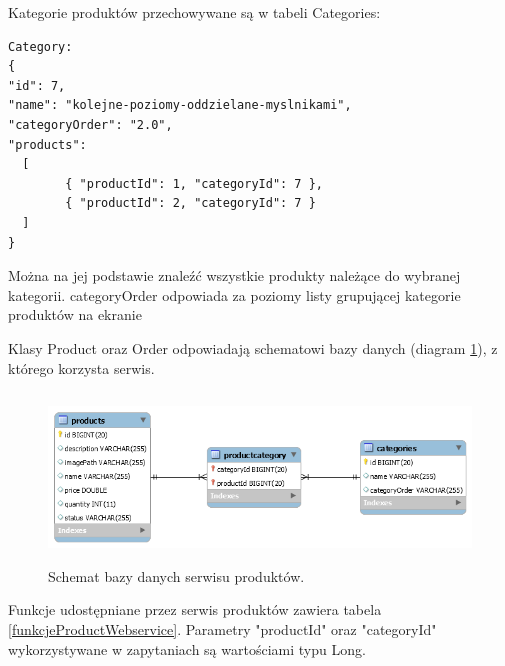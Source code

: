 \documentclass[11pt,a4paper,twoside]{article}
\begin{document}
Kategorie produktów przechowywane są w tabeli Categories:

\begin{lstlisting}
Category: 
{
"id": 7,
"name": "kolejne-poziomy-oddzielane-myslnikami",
"categoryOrder": "2.0",
"products": 
  [
		{ "productId": 1, "categoryId": 7 },
        { "productId": 2, "categoryId": 7 }
  ]
}
\end{lstlisting}
\vspace{-20pt}

Można na jej podstawie znaleźć wszystkie produkty należące do wybranej kategorii. categoryOrder odpowiada za poziomy listy grupującej kategorie produktów na ekranie

Klasy Product oraz Order odpowiadają schematowi bazy danych (diagram \ref{productDB}), z którego korzysta serwis.

\begin{figure}[ht]
\caption{Schemat bazy danych serwisu produktów.}
\label{productDB}
\centering
\includegraphics[height=4.5cm, width=15.7cm]{productDB}
\end{figure}

Funkcje udostępniane przez serwis produktów zawiera tabela \ref{funkcjeProductWebservice}. Parametry "productId" oraz "categoryId" wykorzystywane w zapytaniach są wartościami typu Long.
\end{document}
